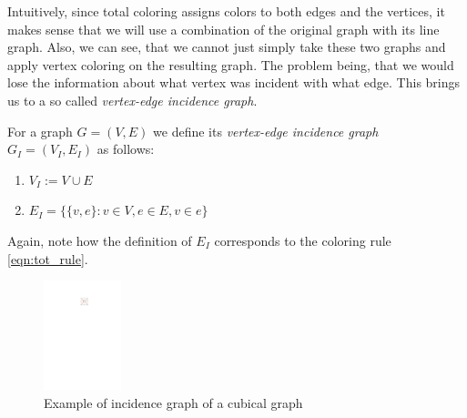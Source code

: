Intuitively, since total coloring assigns colors to both edges and the vertices, it makes sense that we will use a combination of the original graph with its line graph. Also, we can see, that we cannot just simply take these two graphs and apply vertex coloring on the resulting graph. The problem being, that we would lose the information about what vertex was incident with what edge. This brings us to a so called \textit{vertex-edge incidence graph}.

\begin{definition}
    For a graph $G=(V,E)$ we define its \textit{vertex-edge incidence graph} $G_I=(V_I,E_I)$ as follows:
    \begin{enumerate}
        \item $V_I := V \cup E$
        \item $E_I = \{\{v,e\} : v \in V, e \in E, v \in e \}$
    \end{enumerate}
\end{definition}

Again, note how the definition of $E_I$ corresponds to the coloring rule \ref{eqn:tot_rule}.

\begin{figure}[H]
    \centering
    \includegraphics[width=0.2\textwidth]{../Resources/Figs/cubical_incid_graph.pdf}
    \caption{Example of incidence graph of a cubical graph}
    \label{fig:cubical_incid_graph}
\end{figure}